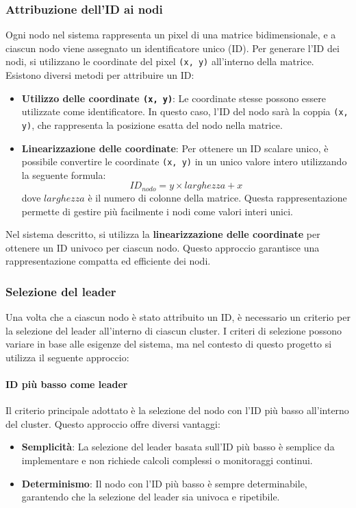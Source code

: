 \documentclass[12pt, a4paper]{report}
\begin{document}
\subsubsection{Attribuzione dell'ID ai nodi}

Ogni nodo nel sistema rappresenta un pixel di una matrice bidimensionale, e a ciascun nodo viene assegnato un identificatore unico (ID). Per generare l'ID dei nodi, si utilizzano le coordinate del pixel \texttt{(x, y)} all'interno della matrice. Esistono diversi metodi per attribuire un ID:

\begin{itemize}
    \item \textbf{Utilizzo delle coordinate \texttt{(x, y)}}: Le coordinate stesse possono essere utilizzate come identificatore. In questo caso, l'ID del nodo sar\`a la coppia \texttt{(x, y)}, che rappresenta la posizione esatta del nodo nella matrice.
    
    \item \textbf{Linearizzazione delle coordinate}: Per ottenere un ID scalare unico, \`e possibile convertire le coordinate \texttt{(x, y)} in un unico valore intero utilizzando la seguente formula:
    \[
    ID_{nodo} = y \times larghezza + x
    \]
    dove $larghezza$ \`e il numero di colonne della matrice. Questa rappresentazione permette di gestire pi\`u facilmente i nodi come valori interi unici.

\end{itemize}

Nel sistema descritto, si utilizza la \textbf{linearizzazione delle coordinate} per ottenere un ID univoco per ciascun nodo. Questo approccio garantisce una rappresentazione compatta ed efficiente dei nodi.

\subsubsection{Selezione del leader}

Una volta che a ciascun nodo \`e stato attribuito un ID, \`e necessario un criterio per la selezione del leader all'interno di ciascun cluster. I criteri di selezione possono variare in base alle esigenze del sistema, ma nel contesto di questo progetto si utilizza il seguente approccio:

\paragraph{ID pi\`u basso come leader}
Il criterio principale adottato \`e la selezione del nodo con l'ID pi\`u basso all'interno del cluster. Questo approccio offre diversi vantaggi:
\begin{itemize}
    \item \textbf{Semplicit\`a}: La selezione del leader basata sull'ID pi\`u basso \`e semplice da implementare e non richiede calcoli complessi o monitoraggi continui.
    \item \textbf{Determinismo}: Il nodo con l'ID pi\`u basso \`e sempre determinabile, garantendo che la selezione del leader sia univoca e ripetibile.
\end{itemize}
\end{document}
